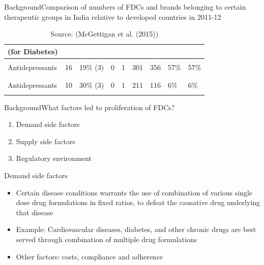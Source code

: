\documentclass[aspectratio=43]{beamer}
\begin{document}
\begin{frame}{Background}{Comparison of numbers of FDCs and brands belonging to certain therapeutic groups in India relative to developed countries in 2011-12}
\begin{table}[h!]
{\begin{tabular}{|p{1.7cm}|p{1.1cm}|p{1.1cm}|p{1.1cm}|p{1.1cm}|p{1.1cm}|p{1.1cm}|p{1.1cm}|p{1.1cm}|}
			(for Diabetes)  &  & &  &  & & & & \\
			\hline
			&  & &  &  & & & & \\
			Antidepressants & 16 & 19\% (3) & 0 & 1 & 301 & 356 & 57\% & 57\% \\
			&  & &  &  & & & & \\
			\hline
			&  & &  &  & & & & \\
			Antidepressants  & 10& 30\% (3) & 0 &  1 & 211 & 116  & 6\% & 6\% \\
			&  & &  &  & & & & \\
			\hline 
		\end{tabular}}
	\caption*{\alert{Source: (McGettigan et al. (2015))}}
	\end{table} 
\end{frame}

\begin{frame}{Background}{What factors led to proliferation of FDCs?}
	\begin{enumerate}
		\item Demand side factors
		\bigskip
		\item Supply side factors
		\bigskip
		\item Regulatory environment
	\end{enumerate}
\end{frame}

\begin{frame}{Demand side factors}
	\begin{itemize}
		\item Certain disease conditions warrants the use of combination of various single dose drug formulations in fixed ratios, to defeat the causative drug underlying that disease
		\medskip
		\pause
		\item Example: Cardiovascular diseases, diabetes, and other chronic drugs are best served through combination of multiple drug formulations
		\medskip
		\pause
		\item \alert{Other factors}: costs, compliance and adherence
	\end{itemize}
\end{frame}
\end{document}
